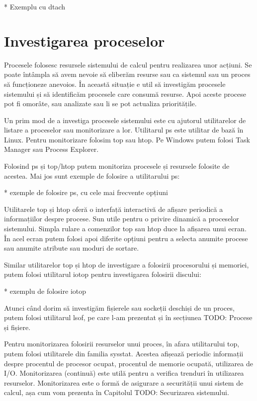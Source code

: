 * Exemplu cu dtach

\section{Investigarea proceselor}
\label{sec:procese-investigare}

Procesele folosesc resursele sistemului de calcul pentru realizarea unor
acțiuni. Se poate întâmpla să avem nevoie să eliberăm resurse sau ca sistemul
sau un proces să funcționeze anevoios. În această situație e util să investigăm
procesele sistemului și să identificăm procesele care consumă resurse. Apoi
aceste procese pot fi omorâte, sau analizate sau li se pot actualiza
prioritățile.

Un prim mod de a investiga procesele sistemului este cu ajutorul utilitarelor de
listare a proceselor sau monitorizare a lor. Utilitarul ps este utilitar de bază
în Linux. Pentru monitorizare folosim top sau htop. Pe Windows putem folosi Task
Manager sau Process Explorer.

Folosind ps și top/htop putem monitoriza procesele și resursele folosite de
acestea. Mai jos sunt exemple de folosire a utilitarului ps:

* exemple de folosire ps, cu cele mai frecvente opțiuni

Utilitarele top și htop oferă o interfață interactivă de afișare periodică a
informațiilor despre procese. Sun utile pentru o privire dinamică a proceselor
sistemului. Simpla rulare a comenzilor top sau htop duce la afișarea unui ecran.
În acel ecran putem folosi apoi diferite opțiuni pentru a selecta anumite
procese sau anumite atribute sau moduri de sortare.

Similar utilitarelor top și htop de investigare a folosirii procesorului și
memoriei, putem folosi utilitarul iotop pentru investigarea folosirii discului:

* exemplu de folosire iotop

Atunci când dorim să investigăm fișierele sau sockeții deschiși de un proces,
putem folosi utilitarul lsof, pe care l-am prezentat și în secțiunea TODO:
Procese și fișiere.

Pentru monitorizarea folosirii resurselor unui proces, în afara utilitarului
top, putem folosi utilitarele din familia sysstat. Acestea afișează periodic
informații despre procentul de procesor ocupat, procentul de memorie ocupată,
utilizarea de I/O. Monitorizarea (continuă) este utilă pentru a verifica
trenduri în utilizarea resurselor. Monitorizarea este o formă de asigurare a
securității unui sistem de calcul, așa cum vom prezenta în Capitolul TODO:
Securizarea sistemului.


